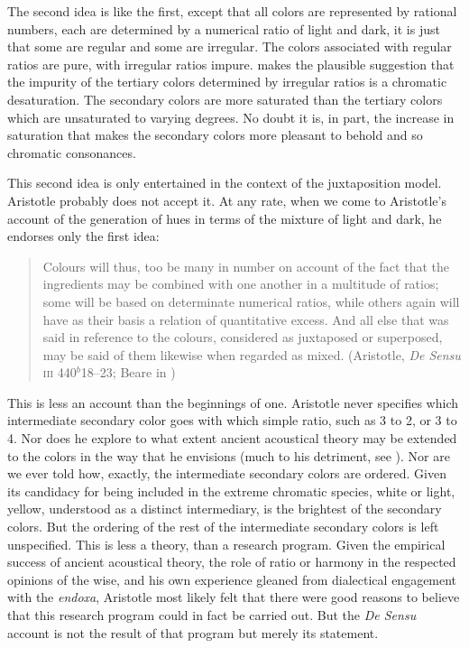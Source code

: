 The second idea is like the first, except that all colors are represented by rational numbers, each are determined by a numerical ratio of light and dark, it is just that some are regular and some are irregular. The colors associated with regular ratios are pure, with irregular ratios impure. \citet[155-156]{Ross:1906fk} makes the plausible suggestion that the impurity of the tertiary colors determined by irregular ratios is a chromatic desaturation. The secondary colors are more saturated than the tertiary colors which are unsaturated to varying degrees. No doubt it is, in part, the increase in saturation that makes the secondary colors more pleasant to behold and so chromatic consonances.

This second idea is only entertained in the context of the juxtaposition model. Aristotle probably does not accept it. At any rate, when we come to Aristotle's account of the generation of hues in terms of the mixture of light and dark, he endorses only the first idea:
\begin{quote}
	Colours will thus, too be many in number on account of the fact that the ingredients may be combined with one another in a multitude of ratios; some will be based on determinate numerical ratios, while others again will have as their basis a relation of quantitative excess. And all else that was said in reference to the colours, considered as juxtaposed or superposed, may be said of them likewise when regarded as mixed. (Aristotle, \emph{De Sensu} \textsc{iii} 440\( ^{b} \)18--23; Beare in \citealt[10]{Barnes:1984uq})
\end{quote}

This is less an account than the beginnings of one. Aristotle never specifies which intermediate secondary color goes with which simple ratio, such as 3 to 2, or 3 to 4. Nor does he explore to what extent ancient acoustical theory may be extended to the colors in the way that he envisions (much to his detriment, see \citealt{Sorabji:2022qf}). Nor are we ever told how, exactly, the intermediate secondary colors are ordered. Given its candidacy for being included in the extreme chromatic species, white or light, yellow, understood as a distinct intermediary, is the brightest of the secondary colors. But the ordering of the rest of the intermediate secondary colors is left unspecified. This is less a theory, than a research program. Given the empirical success of ancient acoustical theory, the role of ratio or harmony in the respected opinions of the wise, and his own experience gleaned from dialectical engagement with the \emph{endoxa}, Aristotle most likely felt that there were good reasons to believe that this research program could in fact be carried out. But the \emph{De Sensu} account is not the result of that program but merely its statement.


